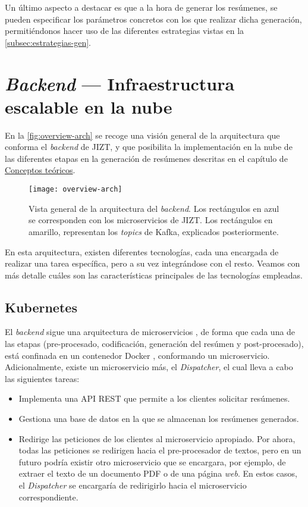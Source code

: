 Un último aspecto a destacar es que a la hora de generar los resúmenes, se pueden especificar los parámetros concretos con los que realizar dicha generación, permitiéndonos hacer uso de las diferentes estrategias vistas en la \autoref{subsec:estrategias-gen}.

\section{\emph{Backend} --- Infraestructura escalable en la nube} \label{sec:backend}

En la \autoref{fig:overview-arch} se recoge una visión general de la arquitectura que conforma el \emph{backend} de JIZT, y que posibilita la implementación en la nube de las diferentes etapas en la generación de resúmenes descritas en el capítulo de \hyperref[chapter:conceptos]{Conceptos teóricos}.

\begin{figure}[!h]
	\centering
	\texttt{[image: overview-arch]}
	\caption[Vista general de la arquitectura del \emph{backend}.]{Vista general de la arquitectura del \emph{backend}. Los rectángulos en azul se corresponden con los microservicios de JIZT. Los rectángulos en amarillo, representan los \emph{topics} de Kafka, explicados posteriormente.}
	\label{fig:overview-arch}
\end{figure}

En esta arquitectura, existen diferentes tecnologías, cada una encargada de realizar una tarea específica, pero a su vez integrándose con el resto. Veamos con más detalle cuáles son las características principales de las tecnologías empleadas.

\subsection{Kubernetes}

El \emph{backend} sigue una arquitectura de microservicios \cite{newman15}, de forma que cada una de las etapas (pre-procesado, codificación, generación del resúmen y post-procesado), está confinada en un contenedor Docker \cite{docker}, conformando un microservicio. Adicionalmente, existe un microservicio más, el \emph{Dispatcher}, el cual lleva a cabo las siguientes tareas:

\vspace{-0.5cm}
\begin{itemize}
	\item [\textbullet] Implementa una API REST que permite a los clientes solicitar resúmenes.
	\item [\textbullet] Gestiona una base de datos en la que se almacenan los resúmenes generados.
	\item [\textbullet] Redirige las peticiones de los clientes al microservicio apropiado. Por ahora, todas las peticiones se redirigen hacia el pre-procesador de textos, pero en un futuro podría existir otro microservicio que se encargara, por ejemplo, de extraer el texto de un documento PDF o de una página \emph{web}. En estos casos, el \emph{Dispatcher} se encargaría de redirigirlo hacia el microservicio correspondiente.
\end{itemize}

